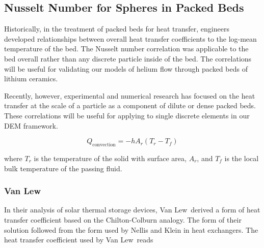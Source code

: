 \subsection{Nusselt Number for Spheres in Packed Beds}\label{sec:particle-convection}

Historically, in the treatment of packed beds for heat transfer, engineers developed relationships between overall heat transfer coefficients to the log-mean temperature of the bed. The Nusselt number correlation was applicable to the bed overall rather than any discrete particle inside of the bed. The correlations will be useful for validating our models of helium flow through packed beds of lithium ceramics.


Recently, however, experimental and numerical research has focused on the heat transfer at the scale of a particle as a component of dilute or dense packed beds. These correlations will be useful for applying to single discrete elements in our DEM framework.

\begin{equation}
	Q_\text{convection} = -hA_r(T_r-T_f)
\end{equation}

where $T_r$ is the temperature of the solid with surface area, $A_r$, and $T_f$ is the local bulk temperature of the passing fluid.

\subsubsection{Van Lew }

In their analysis of solar thermal storage devices, Van Lew\etal~derived a form of heat transfer coefficient based on the Chilton-Colburn analogy.\cite{vanlew133} The form of their solution followed from the form used by Nellis and Klein \cite{Nellis2009} in heat exchangers. The heat transfer coefficient used by Van Lew\etal~reads


